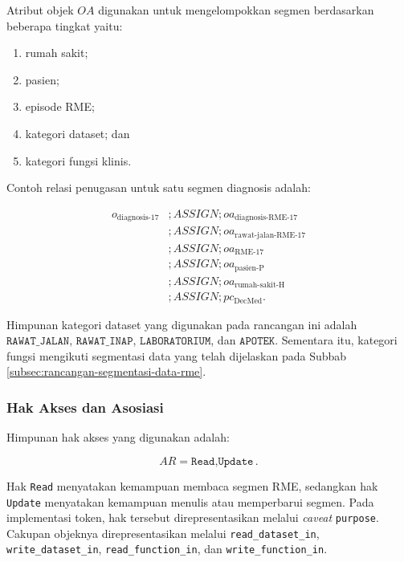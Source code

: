\documentclass[bahasa, 12pt, a4paper, onecolumn, oneside, final]{report}
\begin{document}
Atribut objek $OA$ digunakan untuk mengelompokkan segmen berdasarkan beberapa tingkat yaitu:

\begin{enumerate}
	\item rumah sakit;
	\item pasien;
	\item episode RME;
	\item kategori dataset; dan
	\item kategori fungsi klinis.
\end{enumerate}

Contoh relasi penugasan untuk satu segmen diagnosis adalah:

\begin{equation}
	\begin{aligned}
		o_{\text{diagnosis-17}}
		 & ; ASSIGN ;
		oa_{\text{diagnosis-RME-17}}   \\
		 & ; ASSIGN ;
		oa_{\text{rawat-jalan-RME-17}} \\
		 & ; ASSIGN ;
		oa_{\text{RME-17}}             \\
		 & ; ASSIGN ;
		oa_{\text{pasien-P}}           \\
		 & ; ASSIGN ;
		oa_{\text{rumah-sakit-H}}      \\
		 & ; ASSIGN ;
		pc_{\text{DecMed}}.
	\end{aligned}
\end{equation}

Himpunan kategori dataset yang digunakan pada rancangan ini adalah $\texttt{RAWAT\_JALAN}$, $\texttt{RAWAT\_INAP}$, $\texttt{LABORATORIUM}$, dan $\texttt{APOTEK}$. Sementara itu, kategori fungsi mengikuti segmentasi data yang telah dijelaskan pada Subbab \ref{subsec:rancangan-segmentasi-data-rme}.

\subsubsection{Hak Akses dan Asosiasi}

Himpunan hak akses yang digunakan adalah:

\begin{equation}
	AR = {\texttt{Read},\texttt{Update}}.
\end{equation}

Hak \texttt{Read} menyatakan kemampuan membaca segmen RME, sedangkan hak \texttt{Update} menyatakan kemampuan menulis atau memperbarui segmen. Pada implementasi token, hak tersebut direpresentasikan melalui \textit{caveat} \texttt{purpose}. Cakupan objeknya direpresentasikan melalui \texttt{read\_dataset\_in}, \texttt{write\_dataset\_in}, \texttt{read\_function\_in}, dan \texttt{write\_function\_in}.
\end{document}
